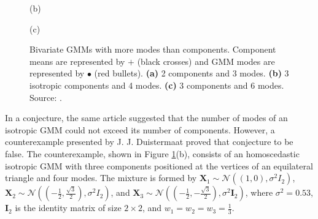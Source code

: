\begin{figure}
\begin{minipage}{0.3333\textwidth}
    (b)
  \end{minipage}\begin{minipage}{0.3333\textwidth}
    \centering

    (c)
  \end{minipage}

  \caption[Bivariate GMMs with more modes than components]{
    Bivariate GMMs with more modes than components. Component means are represented by $+$ (black crosses) and GMM modes are represented by {\color{red} $\bullet$} (red bullets).
    \textbf{(a)} 2 components and 3 modes.
    \textbf{(b)} 3 isotropic components and 4 modes.
    \textbf{(c)} 3 components and 6 modes.
    Source: \citet{Amendola2019}.
  }
  \label{fig:amendola}
\end{figure}

In a conjecture, the same article suggested that the number of modes of an isotropic GMM could not exceed its number of components. However, a counterexample presented by J. J. Duistermaat \citep{Carreira-Perpinan2003a} proved that conjecture to be false. The counterexample, shown in Figure \ref{fig:amendola}(b), consists of an homoscedastic isotropic GMM with three components positioned at the vertices of an equilateral triangle and four modes. The mixture is formed by $\mathbf{X}_1 \sim \mathcal{N}\left((1, 0), \sigma^2I_2\right)$, $\mathbf{X}_2 \sim \mathcal{N}\left(\left(-\frac{1}{2}, \frac{\sqrt{3}}{2}\right), \sigma^2I_2\right)$, and $\mathbf{X}_3 \sim \mathcal{N}\left(\left(-\frac{1}{2}, -\frac{\sqrt{3}}{2}\right), \sigma^2\mathbf{I}_2\right)$, where $\sigma^2 = 0.53$, $\mathbf{I}_2$ is the identity matrix of size $2 \times 2$, and $w_1 = w_2 = w_3 = \frac{1}{3}$.

